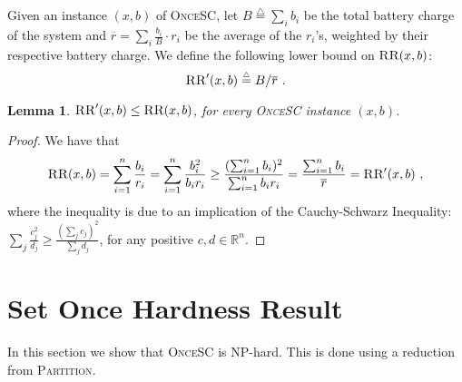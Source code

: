 \documentclass[11pt]{article}
\newtheorem{lemma}{Lemma}
\newcommand{\eqdf}{\stackrel{\scriptscriptstyle \triangle}{=}}
\newcommand{\reals}{\mathbb{R}}
\newcommand{\sosc}{\textsc{OnceSC}\xspace}
\newcommand{\partition}{\textsc{Partition}\xspace}
\newcommand{\RR}{\textsc{RR}\xspace}
\begin{document}
Given an instance $(x,b)$ of \sosc, let $B \eqdf \sum_i b_i$ be the
total battery charge of the system and $\overline{r} = \sum_i
\frac{b_i}{B} \cdot r_i$ be the average of the $r_i$'s, weighted by
their respective battery charge.  We define the following lower bound
on $\RR(x,b)$:
\[
\RR'(x,b) \eqdf B/\overline{r}
~.
\]

\begin{lemma}
\label{lemma:convex}
$\RR'(x,b) \leq \RR(x,b)$, for every \sosc instance $(x,b)$.
\end{lemma}
\begin{proof}
We have that
\[
\RR(x,b) 
=    \sum_{i=1}^n \frac{b_i}{r_i} 
=    \sum_{i=1}^n \frac{b_i^2}{b_i r_i} 
\geq \frac{(\sum_{i=1}^n b_i)^2}{\sum_{i=1}^n b_i r_i} 
=    \frac{\sum_{i=1}^n b_i}{\overline{r}} 
= \RR'(x,b)
~,
\]
where the inequality is due to 
an implication of the Cauchy-Schwarz Inequality: $\sum_j
\frac{c_j^2}{d_j} \geq \frac{(\sum_j c_j)^2}{\sum_j d_j}$, for any
positive $c,d \in \reals^n$.
\end{proof}

\iffalse 

\begin{lemma}(Convexity)
Let $RR'(X) \eqdf \frac{n}{1 - \bar{\alpha}_X}$, where $\bar{\alpha}_X
\eqdf \frac{1}{n} \sum_{i=1}^n \alpha_i$ is the average of the
$\alpha_i$'s in $X$. Then $RR(X) \geq RR'(X)$.
\end{lemma}		
\begin{proof}
Let $f(x) = \frac{1}{1-x}$. Since $f(x)$ is a convex function,
\[
RR'(X) = n \cdot f(\bar{\alpha}_X) \leq \sum_{i=1}^n f(\alpha_i) = RR(X) 
~.
\]
See Figure \ref{fig:convexity} for an illustration.
\end{proof}

\fi 




\section{Set Once Hardness Result}
\label{sec:hardness}

In this section we show that \sosc is NP-hard.  This is done using a
reduction from \partition.
	
\end{document}
